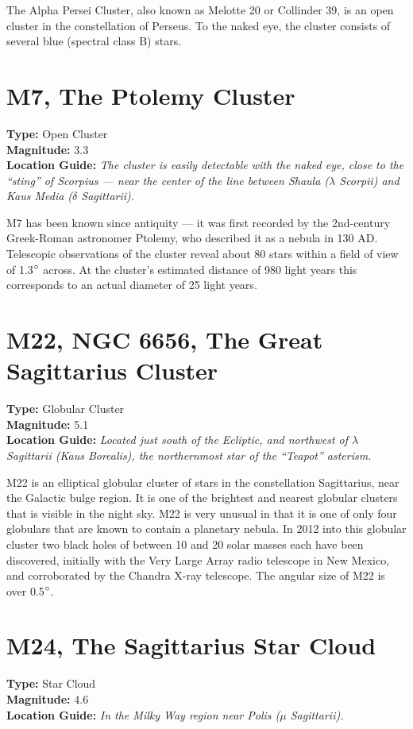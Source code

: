 The Alpha Persei Cluster, also known as Melotte 20 or Collinder 39, is
an open cluster in the constellation of Perseus. To the naked
eye, %
the cluster consists of several blue (spectral class B) stars.

\section{M7, The Ptolemy Cluster}
\textbf{Type:} Open Cluster \\
\textbf{Magnitude:} 3.3 \\
\textbf{Location Guide:} \textit{The cluster is easily detectable with
  the naked eye, close to the ``sting'' of Scorpius --- near the
  center of the line between Shaula ($\lambda$ Scorpii) and Kaus Media
  ($\delta$ Sagittarii).}

M7 has been known since antiquity --- it was first recorded by the
2nd-century Greek-Roman astronomer Ptolemy, who described it as a
nebula in 130 AD. Telescopic observations of the cluster reveal about
80 stars within a field of view of 1.3$\degree$ across. At the
cluster's estimated distance of 980 light years this corresponds to an
actual diameter of 25 light years.

\section{M22, NGC 6656, The Great Sagittarius Cluster} 
\textbf{Type:} Globular Cluster \\ 
\textbf{Magnitude:} 5.1 \\
\textbf{Location Guide:} \textit{Located just south of the Ecliptic, and northwest of $\lambda$ Sagittarii (Kaus Borealis), the northernmost star of the ``Teapot'' asterism.}

M22 is an elliptical globular cluster of stars in the constellation Sagittarius, near the Galactic bulge region. It is one of the brightest and nearest globular clusters that is visible in the night sky. M22 is very unusual in that it is one of only four globulars that are known to contain a planetary nebula. In 2012 into this globular cluster two black holes of between 10 and 20 solar masses each have been discovered, initially with the Very Large Array radio telescope in New Mexico, and corroborated by the Chandra X-ray telescope. The angular size of M22 is over 0.5$\degree$.

\section{M24, The Sagittarius Star Cloud}
\textbf{Type:} Star Cloud \\
\textbf{Magnitude:} 4.6 \\ 
\textbf{Location Guide:} \textit{In the Milky Way region near Polis ($\mu$ Sagittarii).}

